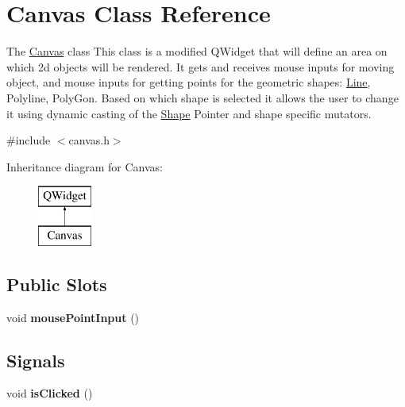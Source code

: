 \hypertarget{class_canvas}{}\section{Canvas Class Reference}
\label{class_canvas}


The \hyperlink{class_canvas}{Canvas} class This class is a modified Q\+Widget that will define an area on which 2d objects will be rendered. It gets and receives mouse inputs for moving object, and mouse inputs for getting points for the geometric shapes\+: \hyperlink{class_line}{Line}, Polyline, Poly\+Gon. Based on which shape is selected it allows the user to change it using dynamic casting of the \hyperlink{class_shape}{Shape} Pointer and shape specific mutators.  




{\ttfamily \#include $<$canvas.\+h$>$}

Inheritance diagram for Canvas\+:\begin{figure}[H]
\begin{center}
\leavevmode
\includegraphics[height=2.000000cm]{class_canvas}
\end{center}
\end{figure}
\subsection*{Public Slots}
\begin{DoxyCompactItemize}
\item 
\mbox{\label{class_canvas_a100162adb347f04ad3ec5ce0c2e118f7}} 
void {\bfseries mouse\+Point\+Input} ()
\end{DoxyCompactItemize}
\subsection*{Signals}
\begin{DoxyCompactItemize}
\item 
\mbox{\label{class_canvas_ab17abdfec6f1ca1d682420f0a124e8f4}} 
void {\bfseries is\+Clicked} ()
\end{DoxyCompactItemize}

